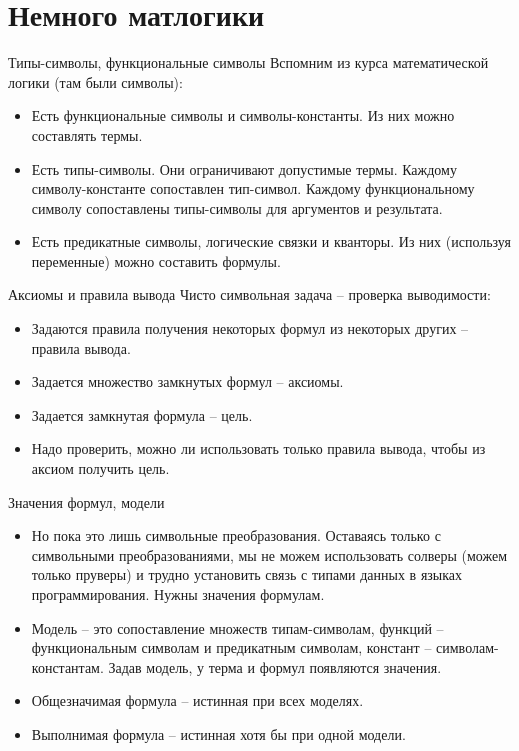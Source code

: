 \documentclass[hyperref={unicode=true}]{beamer}
\begin{document}
    \section{Немного матлогики}

    \begin{frame}{Типы-символы, функциональные символы}
    Вспомним из курса математической логики (там были символы):
    \begin{itemize}
    \item
    Есть функциональные символы и символы-константы.
    Из них можно составлять термы.
    \item
    Есть типы-символы. Они ограничивают допустимые термы.
    Каждому символу-константе сопоставлен тип-символ.
    Каждому функциональному символу сопоставлены типы-символы
    для аргументов и результата.
    \item
    Есть предикатные символы, логические связки и кванторы.
    Из них (используя переменные) можно составить формулы.
    \end{itemize}
    \end{frame}

    \begin{frame}{Аксиомы и правила вывода}
    Чисто символьная задача -- проверка выводимости:
    \begin{itemize}
    \item
    Задаются правила получения некоторых формул из некоторых других
    -- правила вывода.
    \item
    Задается множество замкнутых формул -- аксиомы.
    \item
    Задается замкнутая формула -- цель.
    \item
    Надо проверить, можно ли использовать только правила вывода,
    чтобы из аксиом получить цель.
    \end{itemize}
    \end{frame}

    \begin{frame}{Значения формул, модели}
    \begin{itemize}
    \item
    Но пока это лишь символьные преобразования. Оставаясь
    только с символьными преобразованиями, мы не можем
    использовать солверы (можем только пруверы) и трудно
    установить связь с типами данных в языках программирования.
    Нужны значения формулам.
    \item
    Модель -- это сопоставление множеств типам-символам,
    функций -- функциональным символам и предикатным символам,
    констант -- символам-константам. Задав модель, у терма
    и формул появляются значения.
    \item
    Общезначимая формула -- истинная при всех моделях.
    \item
    Выполнимая формула -- истинная хотя бы при одной модели.
    \end{itemize}
    \end{frame}
\end{document}
